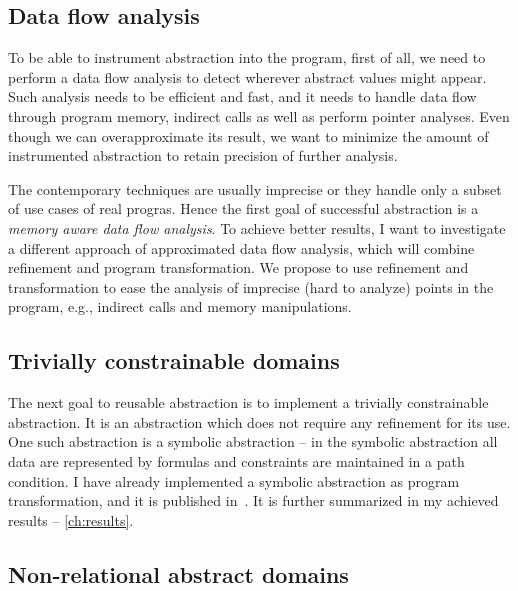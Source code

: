 \subsection{Data flow analysis}

To be able to instrument abstraction into the program, first of all, we need to
perform a data flow analysis to detect wherever abstract values might appear.
Such analysis needs to be efficient and fast, and it needs to handle data flow
through program memory, indirect calls as well as perform pointer analyses. Even though we can
overapproximate its result, we want to minimize the amount of instrumented
abstraction to retain precision of further analysis.

The contemporary techniques are usually imprecise or they handle only a subset of use
cases of real progras. Hence the first goal of successful abstraction is a
\emph{memory aware data flow analysis}. To achieve better results, I want to
investigate a different approach of approximated data flow analysis, which will
combine refinement and program transformation.  We propose to use refinement
and transformation to ease the analysis of imprecise (hard to analyze) points
in the program, e.g., indirect calls and memory manipulations.

\subsection{Trivially constrainable domains}

The next goal to reusable abstraction is to implement a trivially constrainable
abstraction. It is an abstraction which does not require any refinement for its
use. One such abstraction is a symbolic abstraction -- in the symbolic
abstraction all data are represented by formulas and constraints are maintained
in a path condition. I have already implemented a symbolic abstraction as
program transformation, and it is published in~\cite{Lauko2018SymComp}.
It is further summarized in my achieved results -- \autoref{ch:results}.

\subsection{Non-relational abstract domains}

